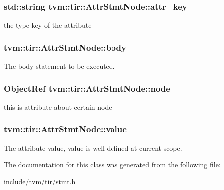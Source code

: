\subsubsection[{\texorpdfstring{attr\+\_\+key}{attr_key}}]{\setlength{\rightskip}{0pt plus 5cm}std\+::string tvm\+::tir\+::\+Attr\+Stmt\+Node\+::attr\+\_\+key}\hypertarget{classtvm_1_1tir_1_1AttrStmtNode_a2c5d6997043fa5ace4180c41bb554e89}{}\label{classtvm_1_1tir_1_1AttrStmtNode_a2c5d6997043fa5ace4180c41bb554e89}


the type key of the attribute 

\subsubsection[{\texorpdfstring{body}{body}}]{ tvm\+::tir\+::\+Attr\+Stmt\+Node\+::body}\hypertarget{classtvm_1_1tir_1_1AttrStmtNode_a67c1ae1a8a7e7032f080aa3f5ae092fb}{}\label{classtvm_1_1tir_1_1AttrStmtNode_a67c1ae1a8a7e7032f080aa3f5ae092fb}


The body statement to be executed. 

\subsubsection[{\texorpdfstring{node}{node}}]{\setlength{\rightskip}{0pt plus 5cm}Object\+Ref tvm\+::tir\+::\+Attr\+Stmt\+Node\+::node}\hypertarget{classtvm_1_1tir_1_1AttrStmtNode_a7dbc9628c9f3f35deaccf0526be4f699}{}\label{classtvm_1_1tir_1_1AttrStmtNode_a7dbc9628c9f3f35deaccf0526be4f699}


this is attribute about certain node 

\subsubsection[{\texorpdfstring{value}{value}}]{ tvm\+::tir\+::\+Attr\+Stmt\+Node\+::value}\hypertarget{classtvm_1_1tir_1_1AttrStmtNode_a4228adcc9320d1f1ce5f9caba1e4faf9}{}\label{classtvm_1_1tir_1_1AttrStmtNode_a4228adcc9320d1f1ce5f9caba1e4faf9}


The attribute value, value is well defined at current scope. 



The documentation for this class was generated from the following file\+:\begin{DoxyCompactItemize}
\item 
include/tvm/tir/\hyperlink{stmt_8h}{stmt.\+h}\end{DoxyCompactItemize}
